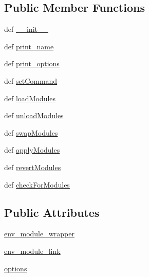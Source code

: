 \subsection*{Public Member Functions}
\begin{DoxyCompactItemize}
\item 
def \hyperlink{class_module_cmd_1_1_module_cmd_afc2639b024f0254c9a1e4db7c0e890cf}{\-\_\-\-\_\-init\-\_\-\-\_\-}
\item 
def \hyperlink{class_module_cmd_1_1_module_cmd_ae44917ee5bdcc85a4b1675f82a2f03b3}{print\-\_\-name}
\item 
def \hyperlink{class_module_cmd_1_1_module_cmd_a731bb50ac44c88e49675b9790740a9af}{print\-\_\-options}
\item 
def \hyperlink{class_module_cmd_1_1_module_cmd_aafcfb3f7b8d445df29c888c938c932fd}{set\-Command}
\item 
def \hyperlink{class_module_cmd_1_1_module_cmd_acb50720c70196a40e3bde85f79fea3cb}{load\-Modules}
\item 
def \hyperlink{class_module_cmd_1_1_module_cmd_a93a6a59db499c50ffb9ffe8e043a4733}{unload\-Modules}
\item 
def \hyperlink{class_module_cmd_1_1_module_cmd_a085423450e86693c636116c09660cf1b}{swap\-Modules}
\item 
def \hyperlink{class_module_cmd_1_1_module_cmd_a0999730ce14c94350177820be74c354f}{apply\-Modules}
\item 
def \hyperlink{class_module_cmd_1_1_module_cmd_a6cb677e48c0ff6283c701585652e8be1}{revert\-Modules}
\item 
def \hyperlink{class_module_cmd_1_1_module_cmd_a0d21ce30690706552cfae88745fbf339}{check\-For\-Modules}
\end{DoxyCompactItemize}
\subsection*{Public Attributes}
\begin{DoxyCompactItemize}
\item 
\hyperlink{class_module_cmd_1_1_module_cmd_ae60edec82191b5a7a1830495b1ca2e3e}{env\-\_\-module\-\_\-wrapper}
\item 
\hyperlink{class_module_cmd_1_1_module_cmd_a1b4a34e278600fe59cd55bb0d56baa61}{env\-\_\-module\-\_\-link}
\item 
\hyperlink{class_module_cmd_1_1_module_cmd_a981a0fc879a722b76faa16b4289ab953}{options}
\end{DoxyCompactItemize}


